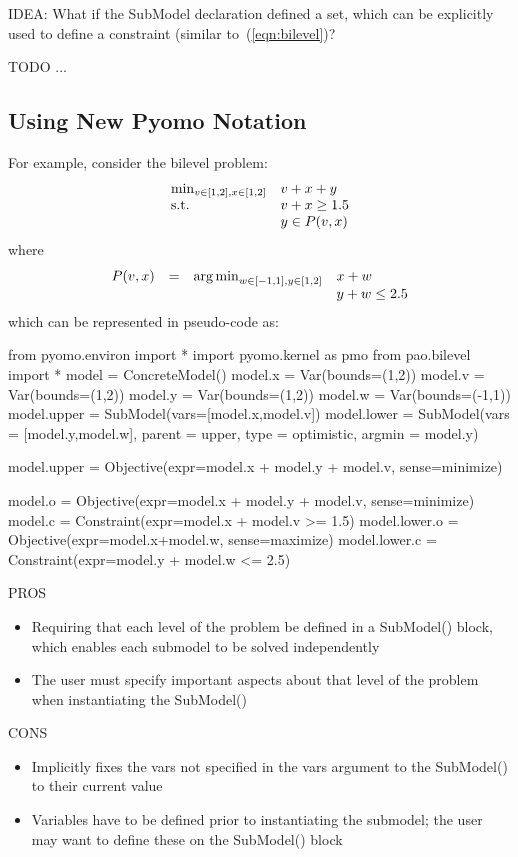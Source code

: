 IDEA:  What if the SubModel declaration defined a set, which can be explicitly used to
define a constraint (similar to~(\ref{eqn:bilevel})?

TODO ...


\subsection{Using New Pyomo Notation}

For example, consider the bilevel problem:
\begin{equation}
\label{eqn:bilevel_ex1}
\begin{array}{ll}
\min_{v \in [1,2], x \in [1,2]}   & v + x + y\\
\textrm{s.t.}                 & v + x\geq 1.5\\
                    & y \in P(v,x)
\end{array}
\end{equation}
where 
\[
\begin{array}{llll}
P(v,x) & = & \operatorname*{arg\,min}_{w \in [-1,1], y \in [1,2]}    & x + w\\
 & &                            &  y + w \leq 2.5
\end{array}
\]
which can be represented in  pseudo-code as:

\begin{qlisting}
from pyomo.environ import *
import pyomo.kernel as pmo
from pao.bilevel import *
model = ConcreteModel()
model.x = Var(bounds=(1,2))
model.v = Var(bounds=(1,2))
model.y = Var(bounds=(1,2))
model.w = Var(bounds=(-1,1))
model.upper = SubModel(vars=[model.x,model.v])
model.lower = SubModel(vars = [model.y,model.w], parent = upper, 
		type = optimistic, argmin = model.y)

model.upper = Objective(expr=model.x + model.y + model.v, sense=minimize)

model.o = Objective(expr=model.x + model.y + model.v, sense=minimize)
model.c = Constraint(expr=model.x + model.v >= 1.5)
model.lower.o = Objective(expr=model.x+model.w, sense=maximize)
model.lower.c = Constraint(expr=model.y + model.w <= 2.5)
\end{qlisting}

\noindent PROS
\begin{itemize}
\item Requiring that each level of the problem be defined in a SubModel() block, which enables each submodel to be solved independently
\item The user must specify important aspects about that level of the problem when instantiating the SubModel()
\end{itemize}
CONS
\begin{itemize}
\item Implicitly fixes the vars not specified in the vars argument to the SubModel() to their current value
\item Variables have to be defined prior to instantiating the submodel; the user may want to define these on the SubModel() block
\end{itemize}

